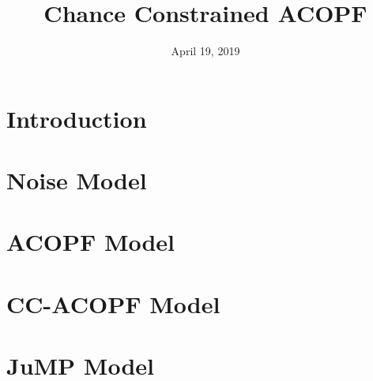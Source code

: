 \documentclass[notitlepage]{article}
\begin{document}
\title{Chance Constrained ACOPF} 
\date{April 19, 2019}
\maketitle

	
	
	\section{Introduction} 
	
	
	\section{Noise Model}
		
	
	\section{ACOPF Model}
		

	\section{CC-ACOPF Model}
		

	\section{JuMP Model}
		




\end{document}
